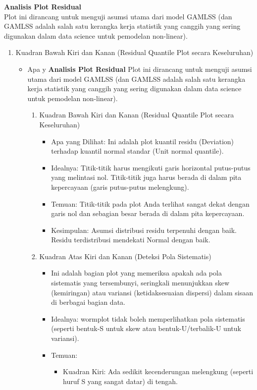 \documentclass[11pt, a4paper]{article}
\begin{document}
\begin{enumerate}
\textbf{Analisis Plot Residual}\\
Plot ini dirancang untuk menguji asumsi utama dari model GAMLSS (dan GAMLSS adalah salah satu kerangka kerja statistik yang canggih yang sering digunakan dalam data science untuk pemodelan non-linear).
\begin{enumerate}
\item Kuadran Bawah Kiri dan Kanan (Residual Quantile Plot secara Keseluruhan)
    \begin{itemize}
    \item Apa y
\textbf{Analisis Plot Residual}
Plot ini dirancang untuk menguji asumsi utama dari model GAMLSS (dan GAMLSS adalah salah satu kerangka kerja statistik yang canggih yang sering digunakan dalam data science untuk pemodelan non-linear).
\begin{enumerate}
\item Kuadran Bawah Kiri dan Kanan (Residual Quantile Plot secara Keseluruhan)
    \begin{itemize}
    \item Apa yang Dilihat: Ini adalah plot kuantil residu (Deviation) terhadap kuantil normal standar (Unit normal quantile).
    \item Idealnya: Titik-titik harus mengikuti garis horizontal putus-putus yang melintasi nol. Titik-titik juga harus berada di dalam pita kepercayaan (garis putus-putus melengkung).
    \item Temuan: Titik-titik pada plot Anda terlihat sangat dekat dengan garis nol dan sebagian besar berada di dalam pita kepercayaan.
    \item Kesimpulan: Asumsi distribusi residu terpenuhi dengan baik. Residu terdistribusi mendekati Normal dengan baik.
    \end{itemize}
\item Kuadran Atas Kiri dan Kanan (Deteksi Pola Sistematis)
    \begin{itemize}
    \item  Ini adalah bagian plot yang memeriksa apakah ada pola sistematis yang tersembunyi, seringkali menunjukkan skew (kemiringan) atau variansi (ketidaksesuaian dispersi) dalam sisaan di berbagai bagian data.
    \item Idealnya: wormplot tidak boleh memperlihatkan pola sistematis (seperti bentuk-S untuk skew atau bentuk-U/terbalik-U untuk variansi).
    \item Temuan:
        \begin{itemize}
            \item Kuadran Kiri: Ada sedikit kecenderungan melengkung (seperti huruf S yang sangat datar) di tengah.

\end{itemize}
\end{itemize}
\end{enumerate}
\end{itemize}
\end{enumerate}
\end{enumerate}
\end{document}
